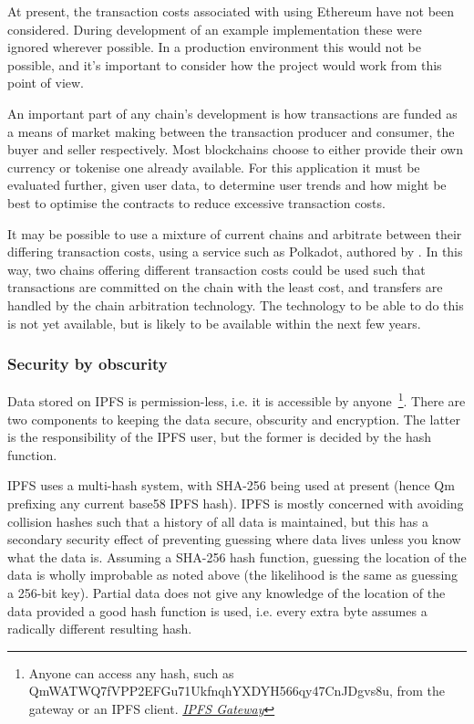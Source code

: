 At present, the transaction costs associated with using Ethereum have not been considered. During development of an example implementation these were ignored wherever possible. In a production environment this would not be possible, and it's important to consider how the project would work from this point of view.

An important part of any chain's development is how transactions are funded as a means of market making between the transaction producer and consumer, the buyer and seller respectively. Most blockchains choose to either provide their own currency or tokenise one already available. For this application it must be evaluated further, given user data, to determine user trends and how might be best to optimise the contracts to reduce excessive transaction costs.

It may be possible to use a mixture of current chains and arbitrate between their differing transaction costs, using a service such as Polkadot, authored by \cite{polkadot:2017:online}. In this way, two chains offering different transaction costs could be used such that transactions are committed on the chain with the least cost, and transfers are handled by the chain arbitration technology. The technology to be able to do this is not yet available, but is likely to be available within the next few years.

\subsubsection{Security by obscurity}

Data stored on IPFS is permission-less, i.e. it is accessible by anyone~\footnote{Anyone can access any hash, such as QmWATWQ7fVPP2EFGu71UkfnqhYXDYH566qy47CnJDgvs8u, from the gateway or an IPFS client. \href{https://gateway.ipfs.io/ipfs/QmWATWQ7fVPP2EFGu71UkfnqhYXDYH566qy47CnJDgvs8u}{\textit{IPFS Gateway}}}. There are two components to keeping the data secure, obscurity and encryption. The latter is the responsibility of the IPFS user, but the former is decided by the hash function.

IPFS uses a multi-hash system, with SHA-256 being used at present (hence Qm prefixing any current base58 IPFS hash). IPFS is mostly concerned with avoiding collision hashes such that a history of all data is maintained, but this has a secondary security effect of preventing guessing where data lives unless you know what the data is. Assuming a SHA-256 hash function, guessing the location of the data is wholly improbable as noted above (the likelihood is the same as guessing a 256-bit key). Partial data does not give any knowledge of the location of the data provided a good hash function is used, i.e. every extra byte assumes a radically different resulting hash.

